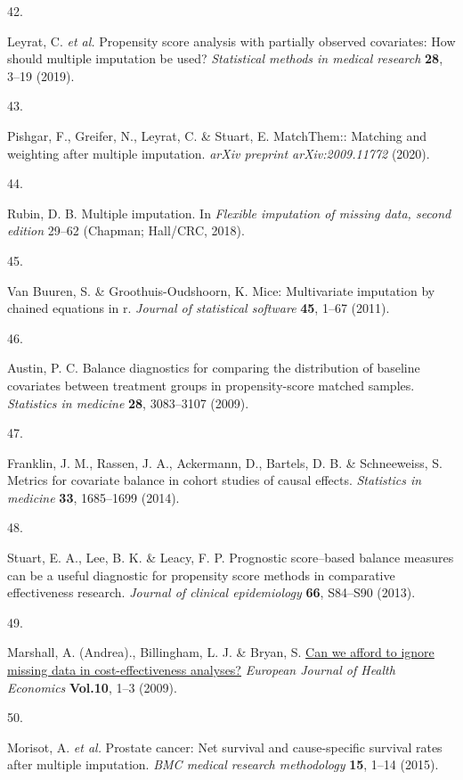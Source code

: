 \documentclass[
  letterpaper,
  DIV=11,
  numbers=noendperiod]{scrartcl}
\newlength{\cslhangindent}
\newlength{\csllabelwidth}
\newenvironment{CSLReferences}[2] %
 {\begin{list}{}{%
  \setlength{\itemindent}{0pt}
  \setlength{\leftmargin}{0pt}
  \setlength{\parsep}{0pt}
  \ifodd #1
   \setlength{\leftmargin}{\cslhangindent}
   \setlength{\itemindent}{-1\cslhangindent}
  \fi
  \setlength{\itemsep}{#2\baselineskip}}}
 {\end{list}}
\newcommand{\CSLLeftMargin}[1]{\parbox[t]{\csllabelwidth}{\strut#1\strut}}
\newcommand{\CSLRightInline}[1]{\parbox[t]{\linewidth - \csllabelwidth}{\strut#1\strut}}
\begin{document}
\begin{CSLReferences}{0}{0}
\CSLLeftMargin{42. }%
\CSLRightInline{Leyrat, C. \emph{et al.} Propensity score analysis with
partially observed covariates: How should multiple imputation be used?
\emph{Statistical methods in medical research} \textbf{28}, 3--19
(2019).}

\CSLLeftMargin{43. }%
\CSLRightInline{Pishgar, F., Greifer, N., Leyrat, C. \& Stuart, E.
MatchThem:: Matching and weighting after multiple imputation.
\emph{arXiv preprint arXiv:2009.11772} (2020).}

\CSLLeftMargin{44. }%
\CSLRightInline{Rubin, D. B. Multiple imputation. In \emph{Flexible
imputation of missing data, second edition} 29--62 (Chapman; Hall/CRC,
2018).}

\CSLLeftMargin{45. }%
\CSLRightInline{Van Buuren, S. \& Groothuis-Oudshoorn, K. Mice:
Multivariate imputation by chained equations in r. \emph{Journal of
statistical software} \textbf{45}, 1--67 (2011).}

\CSLLeftMargin{46. }%
\CSLRightInline{Austin, P. C. Balance diagnostics for comparing the
distribution of baseline covariates between treatment groups in
propensity-score matched samples. \emph{Statistics in medicine}
\textbf{28}, 3083--3107 (2009).}

\CSLLeftMargin{47. }%
\CSLRightInline{Franklin, J. M., Rassen, J. A., Ackermann, D., Bartels,
D. B. \& Schneeweiss, S. Metrics for covariate balance in cohort studies
of causal effects. \emph{Statistics in medicine} \textbf{33}, 1685--1699
(2014).}

\CSLLeftMargin{48. }%
\CSLRightInline{Stuart, E. A., Lee, B. K. \& Leacy, F. P. Prognostic
score--based balance measures can be a useful diagnostic for propensity
score methods in comparative effectiveness research. \emph{Journal of
clinical epidemiology} \textbf{66}, S84--S90 (2013).}

\CSLLeftMargin{49. }%
\CSLRightInline{Marshall, A. (Andrea)., Billingham, L. J. \& Bryan, S.
\href{https://doi.org/10.1007/s10198-008-0129-y\%0A}{Can we afford to
ignore missing data in cost-effectiveness analyses?} \emph{European
Journal of Health Economics} \textbf{Vol.10}, 1--3 (2009).}

\CSLLeftMargin{50. }%
\CSLRightInline{Morisot, A. \emph{et al.} Prostate cancer: Net survival
and cause-specific survival rates after multiple imputation. \emph{BMC
medical research methodology} \textbf{15}, 1--14 (2015).}


\end{CSLReferences}
\end{document}
